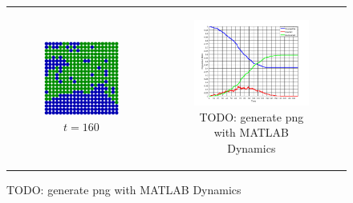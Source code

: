 \begin{figure}
\begin{center}
\begin{tabular}{c c}
    	\\
    	
		\begin{subfigure}[b]{0.3\textwidth}
			\centering
			\includegraphics[width=1\textwidth, angle=0]{./fig/step5_environment/SIR_environment_30x30agents_t160_01dt.png}
			\caption{$t = 160$}
			\label{fig:sir_env_t160}
		\end{subfigure}
		& 
		\begin{subfigure}[b]{0.3\textwidth}
			\centering
			\includegraphics[width=1\textwidth, angle=0]{./fig/step5_environment/SIR_dynamics_30x30agents_300t_01dt.png}
			\caption{TODO: generate png with MATLAB Dynamics}
			\label{fig:sir_dynamics_30x30agents_300t_01dt}
		\end{subfigure}
	\end{tabular}
	

\end{center}
\end{figure}
